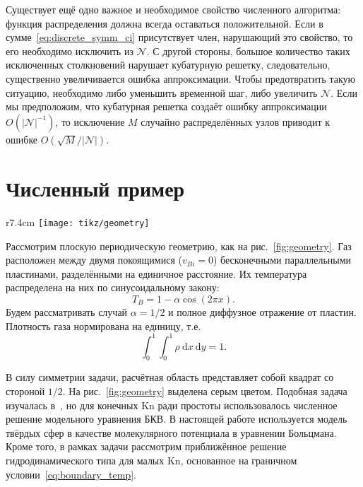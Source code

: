 \documentclass[10pt]{article}
\newcommand{\Kn}{\mathrm{Kn}}
\newcommand{\dd}{\:\mathrm{d}}
\newcommand{\OO}[1]{O(#1)}
\begin{document}
Существует ещё одно важное и необходимое свойство численного алгоритма:
функция распределения должна всегда оставаться положительной.
Если в сумме~\eqref{eq:discrete_symm_ci} присутствует член, нарушающий это свойство,
то его необходимо исключить из \(\mathcal{N}\).
С другой стороны, большое количество таких исключенных столкновений
нарушает кубатурную решетку, следовательно, существенно увеличивается ошибка аппроксимации.
Чтобы предотвратить такую ситуацию, необходимо либо уменьшить временной шаг, либо увеличить \(\mathcal{N}\).
Если мы предположим, что кубатурная решетка создаёт ошибку аппроксимации \(\OO{|\mathcal{N}|^{-1}}\),
то исключение \(M\) случайно распределённых узлов приводит к ошибке \(\OO{\sqrt{M}/|\mathcal{N}|}\).

\section{Численный пример}

\begin{wrapfigure}{r}{7.4cm}
    \vspace{-10pt}
    \centering
    \texttt{[image: tikz/geometry]}
    \vspace{-5pt}
    \caption{Геометрия задачи}\label{fig:geometry}
\end{wrapfigure}

Рассмотрим плоскую периодическую геометрию, как на рис.~\ref{fig:geometry}.
Газ расположен между двумя покоящимися (\(v_{Bi} = 0\)) бесконечными параллельными пластинами,
разделёнными на единичное расстояние. Их температура распределена на них по синусоидальному закону:
\begin{equation}
    T_B = 1-\alpha\cos(2\pi x).
\end{equation}
Будем рассматривать случай \(\alpha=1/2\) и полное диффузное отражение от пластин.
Плотность газа нормирована на единицу, т.е.
\begin{equation}\label{eq:total_mass}
    \int_0^1\int_0^1\rho\dd{x}\dd{y} = 1.
\end{equation}

В силу симметрии задачи, расчётная область представляет собой квадрат со стороной \(1/2\).
На рис.~\ref{fig:geometry} выделена серым цветом.
Подобная задача изучалась в~\cite{Sone1996}, но для конечных \(\Kn\) ради простоты
использовалось численное решение модельного уравнения БКВ.
В настоящей работе используется модель твёрдых сфер в качестве молекулярного потенциала
в уравнении Больцмана.
Кроме того, в рамках задачи рассмотрим приближённое решение гидродинамического типа для малых \(\Kn\),
основанное на граничном условии~\eqref{eq:boundary_temp}.
\end{document}
